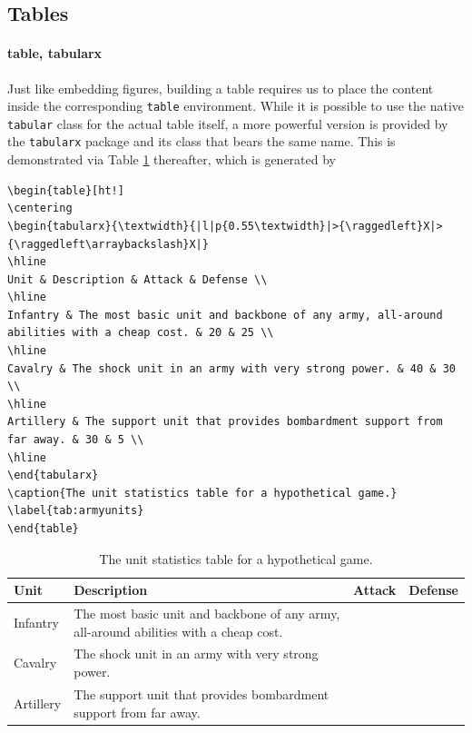 \subsection{Tables}

\paragraph{table, tabularx}
Just like embedding figures, building a table requires us to place the content inside the corresponding \verb|table| environment. While it is possible to use the native \verb|tabular| class for the actual table itself, a more powerful version is provided by the \verb|tabularx| package and its class that bears the same name. This is demonstrated via Table \ref{tab:armyunits} thereafter, which is generated by
\begin{lstlisting}
\begin{table}[ht!]
\centering
\begin{tabularx}{\textwidth}{|l|p{0.55\textwidth}|>{\raggedleft}X|>{\raggedleft\arraybackslash}X|}
\hline
Unit & Description & Attack & Defense \\
\hline
Infantry & The most basic unit and backbone of any army, all-around abilities with a cheap cost. & 20 & 25 \\
\hline
Cavalry & The shock unit in an army with very strong power. & 40 & 30 \\
\hline
Artillery & The support unit that provides bombardment support from far away. & 30 & 5 \\
\hline
\end{tabularx}
\caption{The unit statistics table for a hypothetical game.}
\label{tab:armyunits}
\end{table}
\end{lstlisting}
\begin{table}[ht!]
\centering
\begin{tabularx}{\textwidth}{|l|p{}|>{\raggedleft}X|>{\raggedleft\arraybackslash}X|}
\hline
Unit & Description & Attack & Defense \\
\hline
Infantry & The most basic unit and backbone of any army, all-around abilities with a cheap cost. & 20 & 25 \\
\hline
Cavalry & The shock unit in an army with very strong power. & 40 & 30 \\
\hline
Artillery & The support unit that provides bombardment support from far away. & 30 & 5 \\
\hline
\end{tabularx}
\caption{The unit statistics table for a hypothetical game.}
\label{tab:armyunits}
\end{table}
